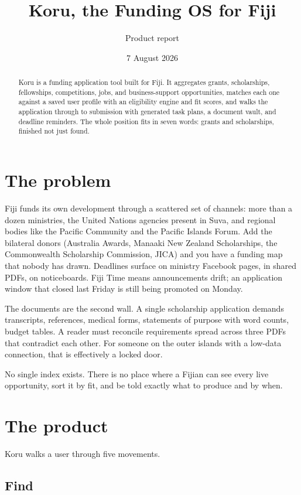 \documentclass[11pt]{article}
\title{Koru, the Funding OS for Fiji}
\author{Product report}
\date{7 August 2026}
\begin{document}
\maketitle

\begin{abstract}
Koru is a funding application tool built for Fiji. It aggregates grants, scholarships, fellowships, competitions, jobs, and business-support opportunities, matches each one against a saved user profile with an eligibility engine and fit scores, and walks the application through to submission with generated task plans, a document vault, and deadline reminders. The whole position fits in seven words: grants and scholarships, finished not just found.
\end{abstract}

\section{The problem}

Fiji funds its own development through a scattered set of channels: more than a dozen ministries, the United Nations agencies present in Suva, and regional bodies like the Pacific Community and the Pacific Islands Forum. Add the bilateral donors (Australia Awards, Manaaki New Zealand Scholarships, the Commonwealth Scholarship Commission, JICA) and you have a funding map that nobody has drawn. Deadlines surface on ministry Facebook pages, in shared PDFs, on noticeboards. Fiji Time means announcements drift; an application window that closed last Friday is still being promoted on Monday.

The documents are the second wall. A single scholarship application demands transcripts, references, medical forms, statements of purpose with word counts, budget tables. A reader must reconcile requirements spread across three PDFs that contradict each other. For someone on the outer islands with a low-data connection, that is effectively a locked door.

No single index exists. There is no place where a Fijian can see every live opportunity, sort it by fit, and be told exactly what to produce and by when.

\section{The product}

Koru walks a user through five movements.

\subsection{Find}
\end{document}
